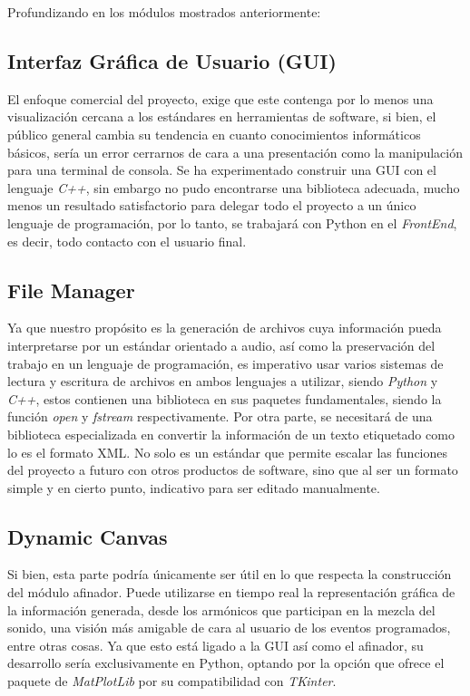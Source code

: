 \documentclass{book}
\begin{document}
	\pagebreak
	Profundizando en los módulos mostrados anteriormente:
	\subsection*{Interfaz Gráfica de Usuario (GUI)}
	El enfoque comercial del proyecto, exige que este contenga por lo menos una visualización cercana a los estándares en herramientas de software, si bien, el público general cambia su tendencia en cuanto conocimientos informáticos básicos, sería un error cerrarnos de cara a una presentación como la manipulación para una terminal de consola. Se ha experimentado construir una GUI con el lenguaje \emph{C++}, sin embargo no pudo encontrarse una biblioteca adecuada, mucho menos un resultado satisfactorio para delegar todo el proyecto a un único lenguaje de programación, por lo tanto, se trabajará con Python en el \emph{FrontEnd}, es decir, todo contacto con el usuario final.\par
	\subsection*{File Manager}
	Ya que nuestro propósito es la generación de archivos cuya información pueda interpretarse por un estándar orientado a audio, así como la preservación del trabajo en un lenguaje de programación, es imperativo usar varios sistemas de lectura y escritura de archivos en ambos lenguajes a utilizar, siendo \emph{Python} y \emph{C++}, estos contienen una biblioteca en sus paquetes fundamentales, siendo la función \emph{open} y \emph{fstream} respectivamente. Por otra parte, se necesitará de una biblioteca especializada en convertir la información de un texto etiquetado como lo es el formato XML. No solo es un estándar que permite escalar las funciones del proyecto a futuro con otros productos de software, sino que al ser un formato simple y en cierto punto, indicativo para ser editado manualmente.
	\subsection*{Dynamic Canvas}
	Si bien, esta parte podría únicamente ser útil en lo que respecta la construcción del módulo afinador. Puede utilizarse en tiempo real la representación gráfica de la información generada, desde los armónicos que participan en la mezcla del sonido, una visión más amigable de cara al usuario de los eventos programados, entre otras cosas. Ya que esto está ligado a la GUI así como el afinador, su desarrollo sería exclusivamente en Python, optando por la opción que ofrece el paquete de \emph{MatPlotLib} por su compatibilidad con \emph{TKinter}.
\end{document}
